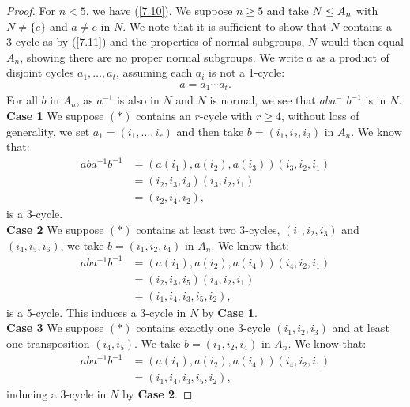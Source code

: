 \begin{proof}
    For $n < 5$, we have (\ref{7.10}). We suppose $n \geq 5$
    and take $N \trianglelefteq A_n$ with $N \neq \{e\}$ and $a \neq e$ in $N$.
    We note that it is sufficient to show that $N$ contains a
    3-cycle as by (\ref{7.11}) and the properties of normal subgroups,
    $N$ would then equal $A_n$, showing there are no proper normal 
    subgroups. We write $a$ as a product of disjoint cycles $a_1, \ldots, a_t$,
    assuming each $a_i$ is not a 1-cycle: \begin{align*}
        a = a_1 \cdots a_t. \tag{$\ast$}
    \end{align*} For all $b$ in $A_n$, as $a^{-1}$ is also in
    $N$ and $N$ is normal, we see that $aba^{-1}b^{-1}$ is in $N$.
    \\[\baselineskip]
    \textbf{Case 1} We suppose $(\ast)$ contains an $r$-cycle
    with $r \geq 4$, without loss of generality, we set
    $a_1 = (i_1, \ldots, i_r)$ and then take $b = (i_1, i_2, i_3)$
    in $A_n$. We know that: \begin{align*}
        aba^{-1}b^{-1} 
        &= (a(i_1), a(i_2), a(i_3))(i_3, i_2, i_1) \\
        &= (i_2, i_3, i_4)(i_3, i_2, i_1) \\
        &= (i_2, i_4, i_2),
    \end{align*} is a 3-cycle.
    \\[\baselineskip]
    \textbf{Case 2}
    We suppose $(\ast)$ contains at least two 3-cycles,
    $(i_1, i_2, i_3)$ and $(i_4, i_5, i_6)$, we take
    $b = (i_1, i_2, i_4)$ in $A_n$. We know that: \begin{align*}
        aba^{-1}b^{-1}
        &= (a(i_1), a(i_2), a(i_4))(i_4, i_2, i_1) \\
        &= (i_2, i_3, i_5)(i_4, i_2, i_1) \\
        &= (i_1, i_4, i_3, i_5, i_2),
    \end{align*} is a 5-cycle. This induces a 3-cycle in $N$ by
    \textbf{Case 1}.
    \\[\baselineskip]
    \textbf{Case 3}
    We suppose $(\ast)$ contains exactly one 3-cycle $(i_1, i_2, i_3)$
    and at least one transposition $(i_4, i_5)$. We take 
    $b = (i_1, i_2, i_4)$ in $A_n$. We know that: \begin{align*}
        aba^{-1}b^{-1}
        &= (a(i_1), a(i_2), a(i_4))(i_4, i_2, i_1) \\
        &= (i_1, i_4, i_3, i_5, i_2),
    \end{align*} inducing a 3-cycle in $N$ by \textbf{Case 2}.

\end{proof}
